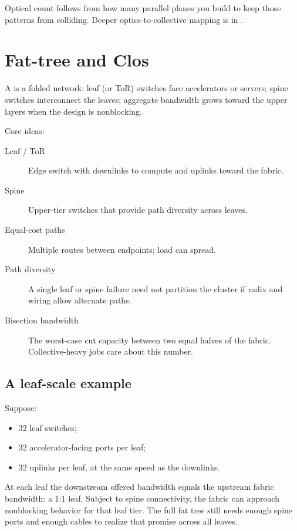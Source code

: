 Optical count follows from how many parallel planes you build to keep those
patterns from colliding. Deeper optics-to-collective mapping is in
.

\section{Fat-tree and Clos}
\label{sec:hpc-fattree}

A  is a folded  network: leaf (or ToR) switches face
accelerators or servers; spine switches interconnect the leaves; aggregate
bandwidth grows toward the upper layers when the design is nonblocking.

Core ideas:

\begin{description}
\item[Leaf / ToR] Edge switch with downlinks to compute and uplinks toward the
      fabric.
\item[Spine] Upper-tier switches that provide path diversity across leaves.
\item[Equal-cost paths] Multiple routes between endpoints; load can spread.
\item[Path diversity] A single leaf or spine failure need not partition the
      cluster if radix and wiring allow alternate paths.
\item[Bisection bandwidth] The worst-case cut capacity between two equal halves
      of the fabric. Collective-heavy jobs care about this number.
\end{description}

\subsection{A leaf-scale example}
\label{sec:hpc-leaf-example}

Suppose:

\begin{itemize}
\item 32 leaf switches;
\item 32 accelerator-facing ports per leaf;
\item 32 uplinks per leaf, at the same speed as the downlinks.
\end{itemize}

At each leaf the downstream offered bandwidth equals the upstream fabric
bandwidth: a 1:1 leaf. Subject to spine connectivity, the fabric can approach
nonblocking behavior for that leaf tier. The full fat tree still needs enough
spine ports and enough cables to realize that promise across all leaves.

